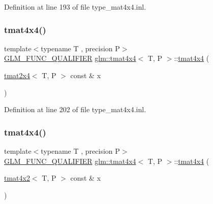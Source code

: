 Definition at line 193 of file type\+\_\+mat4x4.\+inl.

\mbox{\label{structglm_1_1tmat4x4_a2bbdcb0143f39ec4fe8319cc6ceaedd5}} 
\subsubsection{\texorpdfstring{tmat4x4()}{tmat4x4()}\hspace{0.1cm}{\footnotesize\ttfamily [15/22]}}
{\footnotesize\ttfamily template$<$typename T , precision P$>$ \\
\mbox{\hyperlink{setup_8hpp_a33fdea6f91c5f834105f7415e2a64407}{G\+L\+M\+\_\+\+F\+U\+N\+C\+\_\+\+Q\+U\+A\+L\+I\+F\+I\+ER}} \mbox{\hyperlink{structglm_1_1tmat4x4}{glm\+::tmat4x4}}$<$ T, P $>$\+::\mbox{\hyperlink{structglm_1_1tmat4x4}{tmat4x4}} (\begin{DoxyParamCaption}\item[{\mbox{\hyperlink{structglm_1_1tmat2x4}{tmat2x4}}$<$ T, P $>$ const \&}]{x }\end{DoxyParamCaption})}



Definition at line 202 of file type\+\_\+mat4x4.\+inl.

\mbox{\label{structglm_1_1tmat4x4_a23f17aeae300219c962944a180316819}} 
\subsubsection{\texorpdfstring{tmat4x4()}{tmat4x4()}\hspace{0.1cm}{\footnotesize\ttfamily [16/22]}}
{\footnotesize\ttfamily template$<$typename T , precision P$>$ \\
\mbox{\hyperlink{setup_8hpp_a33fdea6f91c5f834105f7415e2a64407}{G\+L\+M\+\_\+\+F\+U\+N\+C\+\_\+\+Q\+U\+A\+L\+I\+F\+I\+ER}} \mbox{\hyperlink{structglm_1_1tmat4x4}{glm\+::tmat4x4}}$<$ T, P $>$\+::\mbox{\hyperlink{structglm_1_1tmat4x4}{tmat4x4}} (\begin{DoxyParamCaption}\item[{\mbox{\hyperlink{structglm_1_1tmat4x2}{tmat4x2}}$<$ T, P $>$ const \&}]{x }\end{DoxyParamCaption})}



